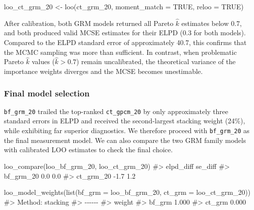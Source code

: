 \documentclass[
  man,
  floatsintext,
  longtable,
  nolmodern,
  notxfonts,
  notimes,
  colorlinks=true,linkcolor=blue,citecolor=blue,urlcolor=blue]{apa7}
\newenvironment{Shaded}{\begin{snugshade}}{\end{snugshade}}
\newcommand{\AttributeTok}[1]{\textcolor[rgb]{0.40,0.45,0.13}{#1}}
\newcommand{\CommentTok}[1]{\textcolor[rgb]{0.37,0.37,0.37}{#1}}
\newcommand{\ConstantTok}[1]{\textcolor[rgb]{0.56,0.35,0.01}{#1}}
\newcommand{\FunctionTok}[1]{\textcolor[rgb]{0.28,0.35,0.67}{#1}}
\newcommand{\NormalTok}[1]{\textcolor[rgb]{0.00,0.23,0.31}{#1}}
\newcommand{\OtherTok}[1]{\textcolor[rgb]{0.00,0.23,0.31}{#1}}
\begin{document}
\begin{Shaded}
\begin{Highlighting}[]
\NormalTok{loo\_ct\_grm\_20 }\OtherTok{\textless{}{-}} \FunctionTok{loo}\NormalTok{(ct\_grm\_20, }\AttributeTok{moment\_match =} \ConstantTok{TRUE}\NormalTok{, }\AttributeTok{reloo =} \ConstantTok{TRUE}\NormalTok{)}
\end{Highlighting}
\end{Shaded}

After calibration, both GRM models returned all Pareto \(\hat{k}\)
estimates below 0.7, and both produced valid MCSE estimates for their
ELPD (0.3 for both models). Compared to the ELPD standard error of
approximately 40.7, this confirms that the MCMC sampling was more than
sufficient. In contrast, when problematic Pareto \(\hat{k}\) values
(\(\hat{k} > 0.7\)) remain uncalibrated, the theoretical variance of the
importance weights diverges and the MCSE becomes unestimable.

\subsubsection{Final model selection}\label{final-model-selection}

\texttt{bf\_grm\_20} trailed the top-ranked \texttt{ct\_gpcm\_20} by
only approximately three standard errors in ELPD and received the
second-largest stacking weight (24\%), while exhibiting far superior
diagnostics. We therefore proceed with \texttt{bf\_grm\_20} as the final
measurement model. We can also compare the two GRM family models with
calibrated LOO estimates to check the final choice.

\begin{Shaded}
\begin{Highlighting}[]
\FunctionTok{loo\_compare}\NormalTok{(loo\_bf\_grm\_20, loo\_ct\_grm\_20)}
\CommentTok{\#\textgreater{}           elpd\_diff se\_diff}
\CommentTok{\#\textgreater{} bf\_grm\_20  0.0       0.0}
\CommentTok{\#\textgreater{} ct\_grm\_20 {-}1.7       1.2}
 
\FunctionTok{loo\_model\_weights}\NormalTok{(}\FunctionTok{list}\NormalTok{(}\AttributeTok{bf\_grm =}\NormalTok{ loo\_bf\_grm\_20, }\AttributeTok{ct\_grm =}\NormalTok{ loo\_ct\_grm\_20))}
\CommentTok{\#\textgreater{} Method: stacking}
\CommentTok{\#\textgreater{} {-}{-}{-}{-}{-}{-}}
\CommentTok{\#\textgreater{}        weight}
\CommentTok{\#\textgreater{} bf\_grm 1.000}
\CommentTok{\#\textgreater{} ct\_grm 0.000}
\end{Highlighting}
\end{Shaded}
\end{document}
